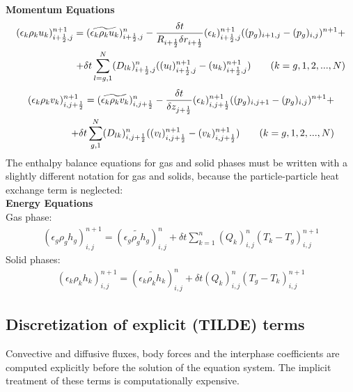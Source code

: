 {\bf Momentum Equations}\\
%
\begin{eqnarray}
\htmlimage{}
(\epsilon_k \rho_k u_k)_{i+\frac{1}{2},j}^{n+1} =
(\widetilde{\epsilon_k \rho_k u_k})_{i+\frac{1}{2},j}^{n} -
\frac{\delta t}{R_{i+\frac{1}{2}}\delta r_{i+\frac{1}{2}}} 
(\epsilon_k)_{i+\frac{1}{2},j}^{n+1}
((p_g)_{i+1,j} - (p_g)_{i,j})^{n+1} + \nonumber \\
+\delta t \sum_{l=g,1}^{N} (D_{lk})^n_{i+\frac{1}{2},j}
((u_l)_{i+\frac{1}{2},j}^{n+1} - (u_k)_{i+\frac{1}{2},j}^{n+1})
\qquad (k=g,1,2,...,N)
\nonumber
\end{eqnarray}
%
\begin{eqnarray}
\htmlimage{}
(\epsilon_k \rho_k v_k)_{i,j+\frac{1}{2}}^{n+1} =
(\widetilde{\epsilon_k \rho_k v_k})_{i,j+\frac{1}{2}}^{n} -
\frac{\delta t}{\delta z_{j+\frac{1}{2}}} (\epsilon_k)_{i,j+\frac{1}{2}}^{n+1}
((p_g)_{i,j+1} - (p_g)_{i,j})^{n+1} + \nonumber \\
+ \delta t \sum_{g,1}^{N} (D_{lk})^n_{i,j+\frac{1}{2}}
((v_l)_{i,j+\frac{1}{2}}^{n+1} - (v_k)_{i,j+\frac{1}{2}}^{n+1})
\qquad (k=g,1,2,...,N)
\nonumber
\end{eqnarray}
%
The enthalpy balance equations for gas and solid phases must be written with a 
slightly different notation for gas and solids, because the particle-particle
heat exchange term is neglected:\\

{\bf Energy Equations}\\
%
Gas phase:
%
\begin{eqnarray}
(\epsilon_g \rho_g h_g)_{i,j}^{n+1} = 
(\widetilde{\epsilon_g \rho_g h_g})^n_{i,j} +
\delta t \sum_{k=1}^{n} (Q_{k})_{i,j}^{n} (T_k - T_g)_{i,j}^{n+1}
\nonumber
\end{eqnarray}
%
Solid phases:
%
\begin{eqnarray}
(\epsilon_k \rho_k h_k)_{i,j}^{n+1} = 
(\widetilde{\epsilon_k \rho_k h_k})^n_{i,j} +
\delta t  (Q_{k})_{i,j}^{n} (T_g - T_k)_{i,j}^{n+1}
\nonumber
\end{eqnarray}
%
\newpage
%
\subsection{Discretization of  explicit (TILDE) terms}
Convective and diffusive fluxes, body forces and the interphase coefficients
are computed explicitly before the solution of the equation system. 
The implicit treatment of these terms is computationally expensive.\\

